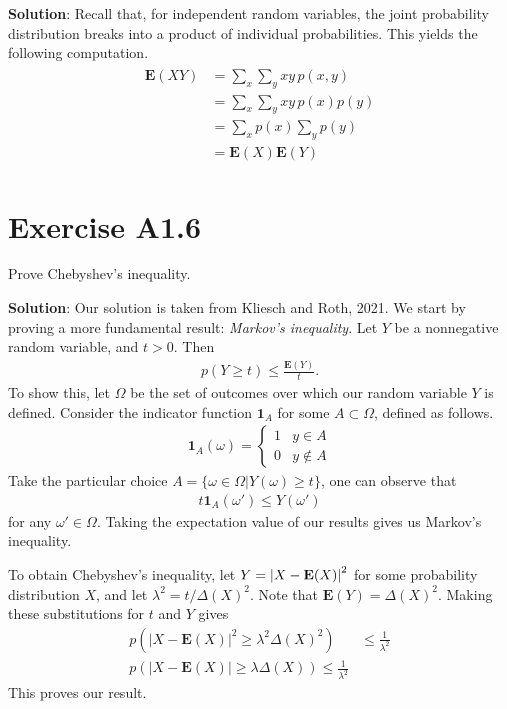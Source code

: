 \documentclass{book}
\begin{document}
    \textbf{Solution}: Recall that, for independent random variables, the joint probability distribution breaks into a product of individual probabilities. This yields the following computation.
    \begin{align}
    \begin{aligned}
        \textbf{E}(XY) &= \sum_x\sum_y xy\,p(x,y)\\
        &= \sum_x\sum_y xy\,p(x)p(y) \\
        &= \sum_x p(x) \sum_y p(y) \\
        &= \textbf{E}(X)\textbf{E}(Y)
    \end{aligned}
    \end{align}

\section*{Exercise A1.6}
    Prove Chebyshev's inequality.
    
    \textbf{Solution}: Our solution is taken from Kliesch and Roth, 2021. We start by proving  a more fundamental result: \emph{Markov's inequality}. Let $Y$ be a nonnegative random variable, and $t>0$. Then
    \begin{align}
        p(Y\geq t) \leq \frac{\textbf{E}(Y)}{t}.
    \end{align}
    To show this, let $\Omega$ be the set of outcomes over which our random variable $Y$ is defined. Consider the indicator function $\textbf{1}_A$ for some $A\subset\Omega$, defined as follows.
    \begin{align}
        \textbf{1}_A (\omega) = 
        \begin{cases}
            1 & y\in A \\
            0 & y \notin A
        \end{cases}
    \end{align}
    Take the particular choice $A = \{\omega\in \Omega| Y(\omega)\geq t\}$, one can observe that
    \begin{align}
        t \textbf{1}_A (\omega')\leq Y(\omega')
    \end{align}
    for any $\omega' \in \Omega$. Taking the expectation value of our results gives us Markov's inequality.
    
    To obtain Chebyshev's inequality, let $Y = \abs{X-\textbf{E}(X)}^2$ for some probability distribution $X$, and let $\lambda^2 = t/\Delta(X)^2$. Note that $\mathbf{E}(Y) = \Delta (X)^2$. Making these substitutions for $t$ and $Y$ gives
    \begin{align}
        p(|X-\mathbf{E}(X)|^2 \geq \lambda^2 \Delta(X)^2) &\leq \frac{1}{\lambda^2} \\
        p(|X-\mathbf{E}(X)|\geq \lambda\Delta(X)) \leq \frac{1}{\lambda^2}
    \end{align}
    This proves our result.
\end{document}
